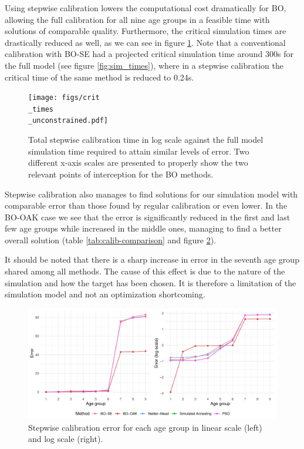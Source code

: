 \documentclass{IOS-Book-Article}
\begin{document}
Using stepwise calibration lowers the computational cost dramatically for BO, allowing the full calibration for all nine age groups in a feasible time with solutions of comparable quality. Furthermore, the critical simulation times are drastically reduced as well, as we can see in figure \ref{fig:crit-times-unconstrained}. Note that a conventional calibration with BO-SE had a projected critical simulation time around 300s for the full model (see figure \ref{fig:sim_times}), where in a stepwise calibration the critical time of the same method is reduced to 0.24s.
		
	\begin{figure}[h!]
		\centering	
		\texttt{[image: figs/crit\\\_times\\\_unconstrained.pdf]}		
		\caption{Total stepwise calibration time in log scale against the full model simulation time required to attain similar levels of error. Two different x-axis scales are presented to properly show the two relevant points of interception for the BO methods.}
		\label{fig:crit-times-unconstrained}	
	\end{figure}

Stepwise calibration also manages to find solutions for our simulation model with comparable error than those found by regular calibration or even lower. In the BO-OAK case we see that the error is significantly reduced in the first and last few age groups while increased in the middle ones, managing to find a better overall solution (table \ref{tab:calib-comparison} and figure \ref{fig:stepwise-error}).
	
It should be noted that there is a sharp increase in error in the seventh age group shared among all methods. The cause of this effect is due to the nature of the simulation and how the target has been chosen. It is therefore a limitation of the simulation model and not an optimization shortcoming.
	
\begin{figure}[h!]
	\centering	
	\includegraphics[width=\textwidth]{figs/stepwise_error.pdf}		
	\caption{Stepwise calibration error for each age group in linear scale (left) and log scale (right).}
	\label{fig:stepwise-error}	
\end{figure}
\end{document}
